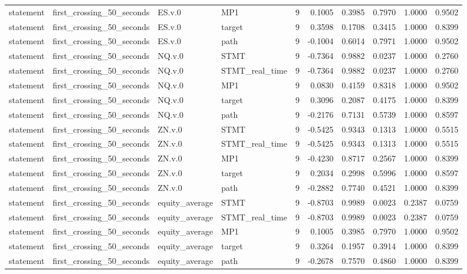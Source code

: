 \begin{tabular}{llllrrrrrr}
statement & first_crossing_50_seconds & ES.v.0 & MP1 & 9 & 0.1005 & 0.3985 & 0.7970 & 1.0000 & 0.9502 \\
statement & first_crossing_50_seconds & ES.v.0 & target & 9 & 0.3598 & 0.1708 & 0.3415 & 1.0000 & 0.8399 \\
statement & first_crossing_50_seconds & ES.v.0 & path & 9 & -0.1004 & 0.6014 & 0.7971 & 1.0000 & 0.9502 \\
statement & first_crossing_50_seconds & NQ.v.0 & STMT & 9 & -0.7364 & 0.9882 & 0.0237 & 1.0000 & 0.2760 \\
statement & first_crossing_50_seconds & NQ.v.0 & STMT_real_time & 9 & -0.7364 & 0.9882 & 0.0237 & 1.0000 & 0.2760 \\
statement & first_crossing_50_seconds & NQ.v.0 & MP1 & 9 & 0.0830 & 0.4159 & 0.8318 & 1.0000 & 0.9502 \\
statement & first_crossing_50_seconds & NQ.v.0 & target & 9 & 0.3096 & 0.2087 & 0.4175 & 1.0000 & 0.8399 \\
statement & first_crossing_50_seconds & NQ.v.0 & path & 9 & -0.2176 & 0.7131 & 0.5739 & 1.0000 & 0.8597 \\
statement & first_crossing_50_seconds & ZN.v.0 & STMT & 9 & -0.5425 & 0.9343 & 0.1313 & 1.0000 & 0.5515 \\
statement & first_crossing_50_seconds & ZN.v.0 & STMT_real_time & 9 & -0.5425 & 0.9343 & 0.1313 & 1.0000 & 0.5515 \\
statement & first_crossing_50_seconds & ZN.v.0 & MP1 & 9 & -0.4230 & 0.8717 & 0.2567 & 1.0000 & 0.8399 \\
statement & first_crossing_50_seconds & ZN.v.0 & target & 9 & 0.2034 & 0.2998 & 0.5996 & 1.0000 & 0.8597 \\
statement & first_crossing_50_seconds & ZN.v.0 & path & 9 & -0.2882 & 0.7740 & 0.4521 & 1.0000 & 0.8399 \\
statement & first_crossing_50_seconds & equity_average & STMT & 9 & -0.8703 & 0.9989 & 0.0023 & 0.2387 & 0.0759 \\
statement & first_crossing_50_seconds & equity_average & STMT_real_time & 9 & -0.8703 & 0.9989 & 0.0023 & 0.2387 & 0.0759 \\
statement & first_crossing_50_seconds & equity_average & MP1 & 9 & 0.1005 & 0.3985 & 0.7970 & 1.0000 & 0.9502 \\
statement & first_crossing_50_seconds & equity_average & target & 9 & 0.3264 & 0.1957 & 0.3914 & 1.0000 & 0.8399 \\
statement & first_crossing_50_seconds & equity_average & path & 9 & -0.2678 & 0.7570 & 0.4860 & 1.0000 & 0.8399 \\

\end{tabular}
